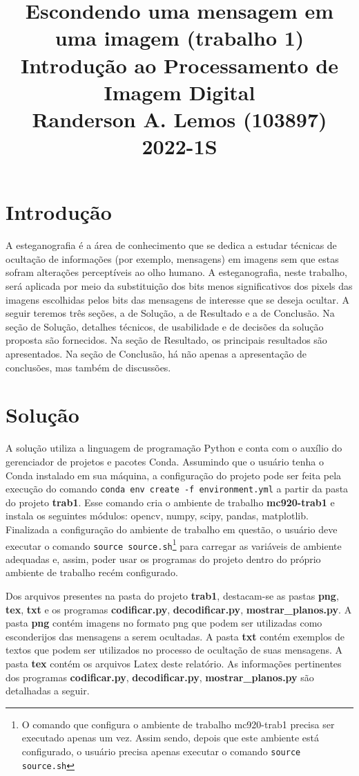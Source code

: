 \documentclass{article}
\title{
	Escondendo uma mensagem em uma imagem (trabalho 1) \\
	\Large Introdução ao Processamento de Imagem Digital \\
	Randerson A. Lemos (103897)
	2022-1S
}
\date{\vspace{-5ex}}
\begin{document}
  \maketitle

%
\section{Introdução}
A esteganografia é a área de conhecimento que se dedica a estudar técnicas de ocultação de informações (por exemplo, mensagens) em imagens sem que estas sofram alterações perceptíveis ao olho humano. A esteganografia, neste trabalho, será aplicada por meio da substituição dos bits menos significativos dos pixels das imagens escolhidas pelos bits das mensagens de interesse que se deseja ocultar. A seguir teremos três seções, a de Solução, a de Resultado e a de Conclusão. Na seção de Solução, detalhes técnicos, de usabilidade e de decisões da solução proposta são fornecidos. Na seção de Resultado, os principais resultados são apresentados. Na seção de Conclusão, há não apenas a apresentação de conclusões, mas também de discussões.

%
\section{Solução}
A solução utiliza a linguagem de programação Python e conta com o auxílio do gerenciador de projetos e pacotes Conda. Assumindo que o usuário tenha o Conda instalado em sua máquina, a configuração do projeto pode ser feita pela execução do comando \lstinline{conda env create -f environment.yml} a partir da pasta do projeto \textbf{trab1}. Esse comando cria o ambiente de trabalho \textbf{mc920-trab1} e instala os seguintes módulos: opencv, numpy, scipy, pandas, matplotlib. Finalizada a configuração do ambiente de trabalho em questão, o usuário deve executar o comando \lstinline{source source.sh}\footnote{O comando que configura o ambiente de trabalho mc920-trab1 precisa ser executado apenas um vez. Assim sendo, depois que este ambiente está configurado, o usuário precisa apenas executar o comando \lstinline{source source.sh}} para carregar as variáveis de ambiente adequadas e, assim, poder usar os programas do projeto dentro do próprio ambiente de trabalho recém configurado. 

Dos arquivos presentes na pasta do projeto \textbf{trab1}, destacam-se as pastas \textbf{png}, \textbf{tex}, \textbf{txt} e os programas \textbf{codificar.py}, \textbf{decodificar.py}, \textbf{mostrar\_planos.py}. A pasta \textbf{png} contém imagens no formato png que podem ser utilizadas como esconderijos das mensagens a serem ocultadas. A pasta \textbf{txt} contém exemplos de textos que podem ser utilizados no processo de ocultação de suas mensagens. A pasta \textbf{tex} contém os arquivos Latex deste relatório. As informações pertinentes dos programas \textbf{codificar.py}, \textbf{decodificar.py}, \textbf{mostrar\_planos.py} são detalhadas a seguir.
\end{document}
